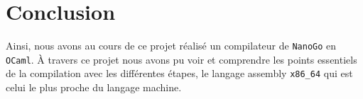 \documentclass[10pt]{report}
\begin{document}
\section{Conclusion}

Ainsi, nous avons au cours de ce projet réalisé un compilateur de \verb|NanoGo| en \verb|OCaml|. À travers ce projet nous avons pu voir et comprendre les points essentiels de la compilation avec les différentes étapes, le langage assembly \verb|x86_64| qui est celui le plus proche du langage machine.
\end{document}
